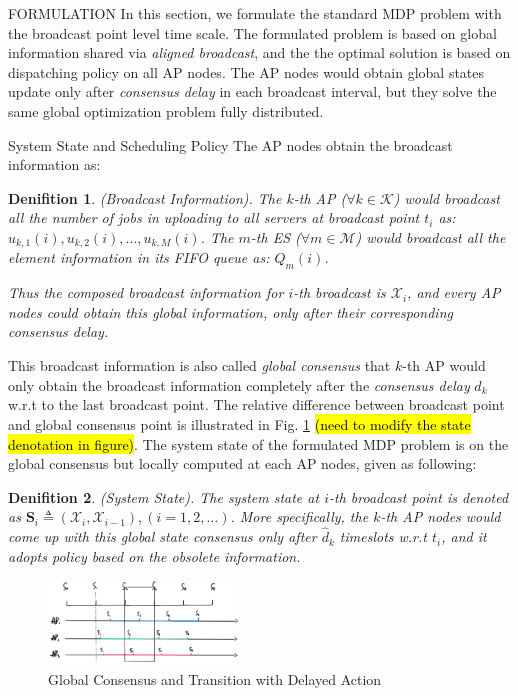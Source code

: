 \documentclass[10pt, conference, letterpaper]{IEEEtran}
\newtheorem{definition}{Denifition}
\newcommand{\define}{\triangleq}
\newcommand{\apSet}{\mathcal{K}}
\newcommand{\esSet}{\mathcal{M}}
\newcommand{\Stat}{\mathbf{S}}
\newcommand{\Obsv}{\mathcal{X}}
\begin{document}
    \begin{section}{FORMULATION}
        \label{sec:formulation}
        In this section, we formulate the standard MDP problem with the broadcast point level time scale. The formulated problem is based on global information shared via \emph{aligned broadcast}, and the the optimal solution is based on dispatching policy on all AP nodes. The AP nodes would obtain global states update only after \emph{consensus delay} in each broadcast interval, but they solve the same global optimization problem fully distributed.

        \begin{subsection}{System State and Scheduling Policy}
            The AP nodes obtain the broadcast information as:
            \begin{definition}(Broadcast Information).
                The $k$-th AP ($\forall k\in\apSet$) would broadcast all the number of jobs in uploading to all servers at broadcast point $t_i$ as: $u_{k,1}(i), u_{k,2}(i), \dots, u_{k,M}(i)$.
                The $m$-th ES ($\forall m\in\esSet$) would broadcast all the element information in its FIFO queue as: $Q_m(i)$.

                Thus the composed broadcast information for $i$-th broadcast is $\Obsv_i$, and every AP nodes could obtain this global information, only after their corresponding consensus delay.
            \end{definition}

            This broadcast information is also called \emph{global consensus} that $k$-th AP would only obtain the broadcast information completely after the \emph{consensus delay} $\hat{d}_{k}$ w.r.t to the last broadcast point. The relative difference between broadcast point and global consensus point is illustrated in Fig. \ref{fig:br-trans} \hl{(need to modify the state denotation in figure)}.
            The system state of the formulated MDP problem is on the global consensus but locally computed at each AP nodes, given as following:
            \begin{definition}(System State).
                The system state at $i$-th broadcast point is denoted as $\Stat_i \define (\Obsv_{i}, \Obsv_{i-1}), (i=1,2,\dots)$.
                More specifically, the $k$-th AP nodes would come up with this global state consensus only after $\hat{d}_k$ timeslots w.r.t $t_i$, and it adopts policy based on the obsolete information.
            \end{definition}
            \begin{figure}[ht]
                \centering
                \includegraphics[width=0.45\textwidth]{broadcast-trans.png}
                \caption{Global Consensus and Transition with Delayed Action}
                \label{fig:br-trans}
            \end{figure}


\end{subsection}
\end{section}
\end{document}
